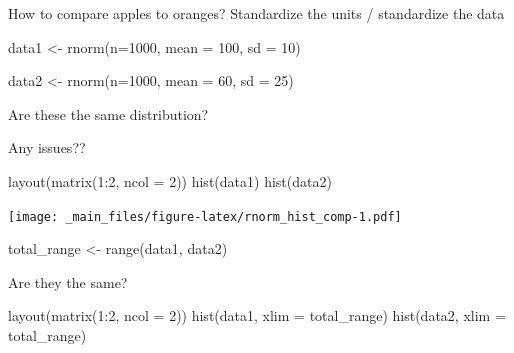 \documentclass[
]{book}
\newenvironment{Shaded}{\begin{snugshade}}{\end{snugshade}}
\newcommand{\AttributeTok}[1]{\textcolor[rgb]{0.77,0.63,0.00}{#1}}
\newcommand{\DecValTok}[1]{\textcolor[rgb]{0.00,0.00,0.81}{#1}}
\newcommand{\FunctionTok}[1]{\textcolor[rgb]{0.00,0.00,0.00}{#1}}
\newcommand{\NormalTok}[1]{#1}
\newcommand{\OtherTok}[1]{\textcolor[rgb]{0.56,0.35,0.01}{#1}}
\newcommand{\SpecialCharTok}[1]{\textcolor[rgb]{0.00,0.00,0.00}{#1}}
\begin{document}
How to compare apples to oranges? Standardize the units / standardize the data

\begin{Shaded}
\begin{Highlighting}[]
\NormalTok{data1 }\OtherTok{\textless{}{-}} \FunctionTok{rnorm}\NormalTok{(}\AttributeTok{n=}\DecValTok{1000}\NormalTok{, }
              \AttributeTok{mean =} \DecValTok{100}\NormalTok{,}
              \AttributeTok{sd =} \DecValTok{10}\NormalTok{)}

\NormalTok{data2 }\OtherTok{\textless{}{-}} \FunctionTok{rnorm}\NormalTok{(}\AttributeTok{n=}\DecValTok{1000}\NormalTok{,}
               \AttributeTok{mean =} \DecValTok{60}\NormalTok{, }
               \AttributeTok{sd =} \DecValTok{25}\NormalTok{)}
\end{Highlighting}
\end{Shaded}

Are these the same distribution?

Any issues??

\begin{Shaded}
\begin{Highlighting}[]
\FunctionTok{layout}\NormalTok{(}\FunctionTok{matrix}\NormalTok{(}\DecValTok{1}\SpecialCharTok{:}\DecValTok{2}\NormalTok{, }\AttributeTok{ncol =} \DecValTok{2}\NormalTok{))}
\FunctionTok{hist}\NormalTok{(data1)}
\FunctionTok{hist}\NormalTok{(data2)}
\end{Highlighting}
\end{Shaded}

\texttt{[image: \_main\_files/figure-latex/rnorm\_hist\_comp-1.pdf]}

\begin{Shaded}
\begin{Highlighting}[]
\NormalTok{total\_range }\OtherTok{\textless{}{-}} \FunctionTok{range}\NormalTok{(data1, data2)}
\end{Highlighting}
\end{Shaded}

Are they the same?

\begin{Shaded}
\begin{Highlighting}[]
\FunctionTok{layout}\NormalTok{(}\FunctionTok{matrix}\NormalTok{(}\DecValTok{1}\SpecialCharTok{:}\DecValTok{2}\NormalTok{, }\AttributeTok{ncol =} \DecValTok{2}\NormalTok{))}
\FunctionTok{hist}\NormalTok{(data1, }\AttributeTok{xlim =}\NormalTok{ total\_range)}
\FunctionTok{hist}\NormalTok{(data2, }\AttributeTok{xlim =}\NormalTok{ total\_range)}
\end{Highlighting}
\end{Shaded}
\end{document}
